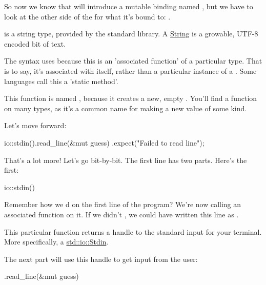 \blank

So now we know that  will introduce a mutable binding named , but we have to look at the 
other side of the \code{=} for what it's bound to: .

\blank

 is a string type, provided by the standard library. A 
\href{https://doc.rust-lang.org/std/string/struct.String.html}{String} is a growable, UTF-8 encoded bit of text.

\blank

The  syntax uses \code{::} because this is an 'associated function' of a particular type. That is to say, it's
associated with  itself, rather than a particular instance of a . Some languages call this a 
'static method'.

\blank

This function is named , because it creates a new, empty . You'll find a  function on 
many types, as it's a common name for making a new value of some kind.

\blank

Let's move forward:

\begin{rustc}
    io::stdin().read_line(&mut guess)
        .expect("Failed to read line");

\end{rustc}

That's a lot more! Let's go bit-by-bit. The first line has two parts. Here's the first:

\begin{rustc}
io::stdin()
\end{rustc}

Remember how we d  on the first line of the program? We're now calling an associated 
function on it. If we didn't , we could have written this line as .

\blank

This particular function returns a handle to the standard input for your terminal. More specifically, a 
\href{https://doc.rust-lang.org/std/io/struct.Stdin.html}{std::io::Stdin}.

\blank

The next part will use this handle to get input from the user:

\begin{rustc}
.read_line(&mut guess)
\end{rustc}

